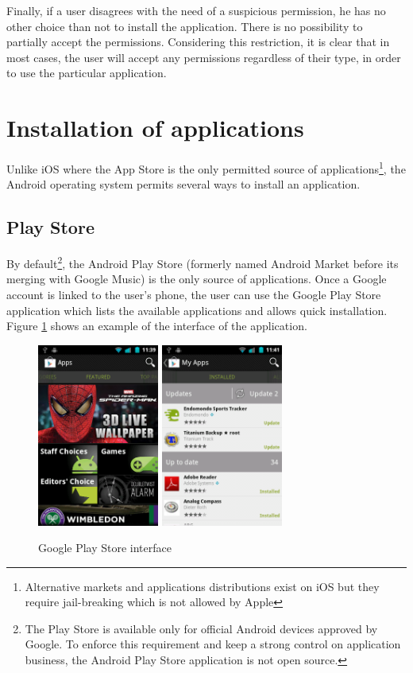 Finally, if a user disagrees with the need of a suspicious permission, he has no other choice than not to install the application.
There is no possibility to partially accept the permissions.
Considering this restriction, it is clear that in most cases, the user will accept any permissions regardless of their type, in order to use the particular application.

\section{Installation of applications}

Unlike iOS where the App Store is the only permitted source of applications\footnote{Alternative markets and applications distributions exist on iOS but they require jail-breaking which is not allowed by Apple}, the Android operating system permits several ways to install an application.

\subsection{Play Store}
By default\footnote{The Play Store is available only for official Android devices approved by Google. To enforce this requirement and keep a strong control on application business, the Android Play Store application is not open source.}, the Android Play Store (formerly named Android Market before its merging with Google Music) is the only source of applications.
Once a Google account is linked to the user's phone, the user can use the Google Play Store application which lists the available applications and allows quick installation.
Figure \ref{fig:market} shows an example of the interface of the application.\\

\begin{figure}[h]
  \centering
  \includegraphics[width=4cm]{images/market1.png}
  \includegraphics[width=4cm]{images/market2.png}
  \caption{Google Play Store interface}
  \label{fig:market}
\end{figure}

